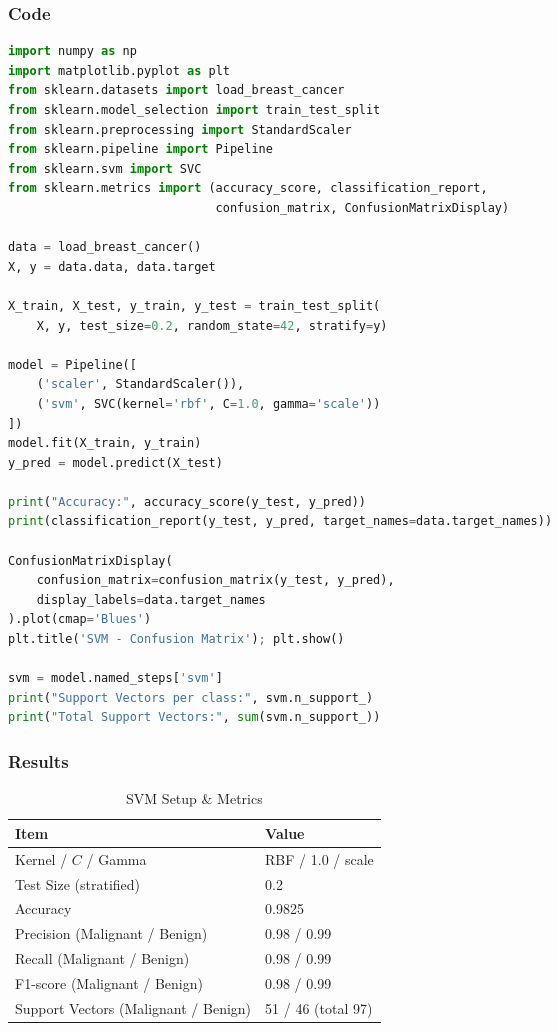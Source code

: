 \documentclass[a4paper,10pt]{article}
\begin{document}
\subsubsection{Code}
\begin{lstlisting}[language=Python, caption={SVM Implementation}]
import numpy as np
import matplotlib.pyplot as plt
from sklearn.datasets import load_breast_cancer
from sklearn.model_selection import train_test_split
from sklearn.preprocessing import StandardScaler
from sklearn.pipeline import Pipeline
from sklearn.svm import SVC
from sklearn.metrics import (accuracy_score, classification_report,
                             confusion_matrix, ConfusionMatrixDisplay)

data = load_breast_cancer()
X, y = data.data, data.target

X_train, X_test, y_train, y_test = train_test_split(
    X, y, test_size=0.2, random_state=42, stratify=y)

model = Pipeline([
    ('scaler', StandardScaler()),
    ('svm', SVC(kernel='rbf', C=1.0, gamma='scale'))
])
model.fit(X_train, y_train)
y_pred = model.predict(X_test)

print("Accuracy:", accuracy_score(y_test, y_pred))
print(classification_report(y_test, y_pred, target_names=data.target_names))

ConfusionMatrixDisplay(
    confusion_matrix=confusion_matrix(y_test, y_pred),
    display_labels=data.target_names
).plot(cmap='Blues')
plt.title('SVM - Confusion Matrix'); plt.show()

svm = model.named_steps['svm']
print("Support Vectors per class:", svm.n_support_)
print("Total Support Vectors:", sum(svm.n_support_))
\end{lstlisting}

\subsubsection{Results}
\begin{table}[H]
\centering
\caption{SVM Setup \& Metrics}
\begin{tabular}{ll}
\toprule
\textbf{Item} & \textbf{Value} \\
\midrule
Kernel / \(C\) / Gamma & RBF / 1.0 / scale \\
Test Size (stratified) & 0.2 \\
Accuracy & 0.9825 \\
Precision (Malignant / Benign) & 0.98 / 0.99 \\
Recall (Malignant / Benign) & 0.98 / 0.99 \\
F1-score (Malignant / Benign) & 0.98 / 0.99 \\
Support Vectors (Malignant / Benign) & 51 / 46 (total 97) \\
\bottomrule
\end{tabular}
\end{table}
\end{document}
